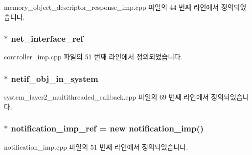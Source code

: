 memory\+\_\+object\+\_\+descriptor\+\_\+response\+\_\+imp.\+cpp 파일의 44 번째 라인에서 정의되었습니다.

\subsubsection[{\texorpdfstring{net\+\_\+interface\+\_\+ref}{net_interface_ref}}]{ $\ast$ net\+\_\+interface\+\_\+ref}\hypertarget{namespaceavdecc__lib_adb4da03bc65b7846cc240ee919bbde19}{}\label{namespaceavdecc__lib_adb4da03bc65b7846cc240ee919bbde19}


controller\+\_\+imp.\+cpp 파일의 51 번째 라인에서 정의되었습니다.

\subsubsection[{\texorpdfstring{netif\+\_\+obj\+\_\+in\+\_\+system}{netif_obj_in_system}}]{ $\ast$ netif\+\_\+obj\+\_\+in\+\_\+system}\hypertarget{namespaceavdecc__lib_aa02659d86782158e7934e97da042e57a}{}\label{namespaceavdecc__lib_aa02659d86782158e7934e97da042e57a}


system\+\_\+layer2\+\_\+multithreaded\+\_\+callback.\+cpp 파일의 69 번째 라인에서 정의되었습니다.

\subsubsection[{\texorpdfstring{notification\+\_\+imp\+\_\+ref}{notification_imp_ref}}]{ $\ast$ notification\+\_\+imp\+\_\+ref = new {\bf notification\+\_\+imp}()}\hypertarget{namespaceavdecc__lib_aca078f7550e970a17b3f732c26bc3d83}{}\label{namespaceavdecc__lib_aca078f7550e970a17b3f732c26bc3d83}


notification\+\_\+imp.\+cpp 파일의 51 번째 라인에서 정의되었습니다.

